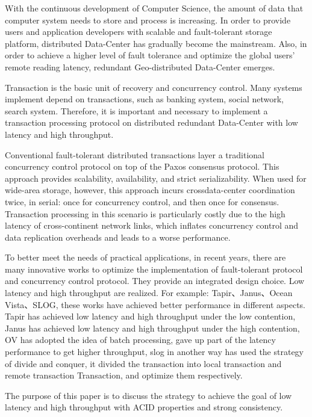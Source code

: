 \begin{enabstract}
  With the continuous development of Computer Science, the amount of data that computer system needs to store and process is increasing. In order to provide users and application developers with scalable and fault-tolerant storage platform, distributed Data-Center has gradually become the mainstream. Also, in order to achieve a higher level of fault tolerance and optimize the global users' remote reading latency, redundant Geo-distributed Data-Center emerges.

  Transaction is the basic unit of recovery and concurrency control. Many systems implement depend on transactions, such as banking system, social network, search system. Therefore, it is important and necessary to implement a transaction processing protocol on distributed redundant Data-Center with low latency and high throughput.

  Conventional fault-tolerant distributed transactions layer a traditional concurrency control protocol on top of the Paxos consensus protocol\cite{Spanner}. This approach provides scalability, availability, and strict serializability. When used for wide-area storage, however, this approach incurs crossdata-center coordination twice, in serial: once for concurrency control, and then once for consensus. Transaction processing in this scenario is particularly costly due to the high latency of cross-continent network links, which inﬂates concurrency control and data replication overheads and leads to a worse performance.
  
  To better meet the needs of practical applications, in recent years, there are many innovative works to optimize the implementation of fault-tolerant protocol and concurrency control protocol. They provide an integrated design choice. Low latency and high throughput are realized. For example: Tapir\cite{Tapir}、Janus\cite{Janus}、Ocean Vista\cite{OV}、SLOG\cite{SLOG}, these works have achieved better performance in different aspects. Tapir has achieved low latency and high throughput under the low contention, Janus has achieved low latency and high throughput under the high contention, OV has adopted the idea of batch processing, gave up part of the latency performance to get higher throughput, slog in another way has used the strategy of divide and conquer, it divided the transaction into local transaction and remote transaction Transaction, and optimize them respectively.

  The purpose of this paper is to discuss the strategy to achieve the goal of low latency and high throughput with ACID properties and strong consistency. 

\end{enabstract}
